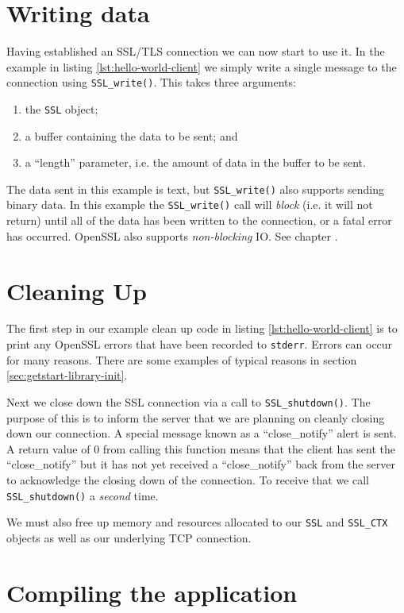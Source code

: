 \section{Writing data}

Having established an SSL/TLS connection we can now start to use it. In the 
example in listing \ref{lst:hello-world-client} we simply write a single 
message to the connection using \verb!SSL_write()!. This takes three arguments:
\begin{enumerate}
\item the \texttt{SSL} object;
\item a buffer containing the data to be sent; and
\item a ``length'' parameter, i.e. the amount of data in the buffer to be sent.
\end{enumerate}

The data sent in this example is text, but \verb!SSL_write()! also supports 
sending binary data. In this example the \verb!SSL_write()! call will
\emph{block} (i.e. it will not return) until all of the data has been written
to the connection, or a fatal error has occurred. OpenSSL also supports
\emph{non-blocking} IO. See chapter .

\section{Cleaning Up}

The first step in our example clean up code in listing
\ref{lst:hello-world-client} is to print any OpenSSL errors that have been 
recorded to \verb!stderr!. Errors can occur for many reasons. There are some
examples of typical reasons in section \ref{sec:getstart-library-init}.

Next we close down the SSL connection via a call to \verb!SSL_shutdown()!. The 
purpose of this is to inform the server that we are planning on cleanly closing 
down our connection. A special message known as a ``close\_notify'' alert is 
sent. A return value of 0 from calling this function means that the client has 
sent the ``close\_notify'' but it has not yet received a ``close\_notify'' back 
from the server to acknowledge the closing down of the connection. To receive 
that we call \verb!SSL_shutdown()! a \emph{second} time.

We must also free up memory and resources allocated to our \verb!SSL! and
\verb!SSL_CTX! objects as well as our underlying TCP connection.

\section {Compiling the application}

